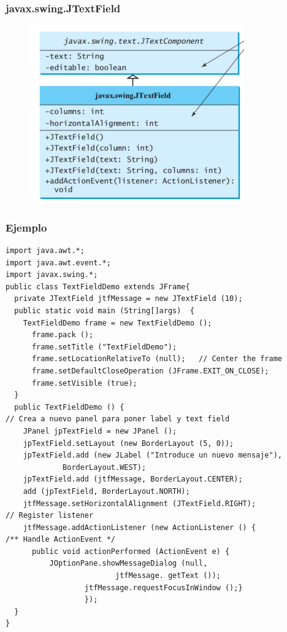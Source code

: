 \documentclass{beamer}
\begin{document}
\begin{frame}
\frametitle{javax.swing.JTextField} 
\begin{figure}
\includegraphics[scale=0.7]{imagenes/text.png} 
\end{figure} 
\end{frame}

\begin{frame}[fragile]
\frametitle{Ejemplo}
\begin{tiny}
\begin{verbatim}
import java.awt.*;
import java.awt.event.*;
import javax.swing.*;
public class TextFieldDemo extends JFrame{
  private JTextField jtfMessage = new JTextField (10);
  public static void main (String[]args)  {
    TextFieldDemo frame = new TextFieldDemo ();
      frame.pack ();
      frame.setTitle ("TextFieldDemo");
      frame.setLocationRelativeTo (null);	// Center the frame
      frame.setDefaultCloseOperation (JFrame.EXIT_ON_CLOSE);
      frame.setVisible (true);
  }
  public TextFieldDemo () {
// Crea a nuevo panel para poner label y text field
    JPanel jpTextField = new JPanel ();
    jpTextField.setLayout (new BorderLayout (5, 0));
    jpTextField.add (new JLabel ("Introduce un nuevo mensaje"),
		     BorderLayout.WEST);
    jpTextField.add (jtfMessage, BorderLayout.CENTER);
    add (jpTextField, BorderLayout.NORTH);
    jtfMessage.setHorizontalAlignment (JTextField.RIGHT);
// Register listener
    jtfMessage.addActionListener (new ActionListener () {
/** Handle ActionEvent */
	  public void actionPerformed (ActionEvent e) {
      	  JOptionPane.showMessageDialog (null,
						 jtfMessage. getText ());
				  jtfMessage.requestFocusInWindow ();}
				  });
  }
}
\end{verbatim}
\end{tiny}
\end{frame}
\end{document}
